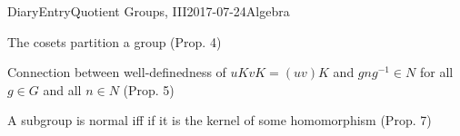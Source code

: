 DiaryEntry{Quotient Groups, III}{2017-07-24}{Algebra}

The cosets partition a group (Prop. 4)

Connection between well-definedness of $uK vK = (uv)K$ and $gng^{-1} \in N$ for all $g \in G$ and all $n \in N$ (Prop. 5)

A subgroup is normal iff if it is the kernel of some homomorphism (Prop. 7)


